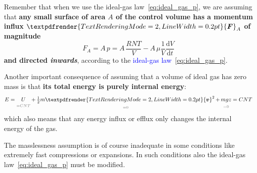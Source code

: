 \documentclass[a4paper,12pt,%
onecolumn,oneside,%
british%
]{memoir}
\renewcommand*{\bm}[1]{\textpdfrender{TextRenderingMode=2,LineWidth=0.2pt}{\boldsymbol{#1}}}
\newcommand*{\di}{\mathrm{d}}%
\renewcommand*{\|}[1][]{\nonscript\:#1\vert\nonscript\:\mathopen{}}
\newcommand*{\sect}{\S}%
\renewcommand*{\autoref}[2]{\sidepar{\vspace{-1ex}\footnotesize{\color{blue}\faIcon{%
angle-right%
}\enskip\sect~\ref{#1} page~\pageref{#1}}}\textcolor{blue}{#2}}
\newcommand*{\yvis}{\mu} %
\newcommand*{\yv}{\bm{v}}
\newcommand*{\yN}{N}
\newcommand*{\ym}{m}%
\newcommand*{\yE}{E}
\newcommand*{\yU}{U}
\newcommand*{\yF}{\bm{F}}
\newcommand*{\ypr}{p} %
\newcommand*{\yT}{T}%
\begin{document}
Remember that when we use the ideal-gas law~\eqref{eq:ideal_gas_p}, we are assuming that \textbf{any small surface of area $A$ of the control volume has a momentum influx $\yF_{A}$ of magnitude}
\begin{equation*}
  F_{A} = A\,\ypr = A\,\frac{R \yN \yT}{V} - A\,\yvis \frac{1}{V}\frac{\di V}{\di t}
\end{equation*}
\textbf{and directed \emph{inwards}}, according to the \autoref{def:idealgas_law}{ideal-gas law}~\eqref{eq:ideal_gas_p}.

\medskip

Another important consequence of assuming that a volume of ideal gas has zero mass is that \textbf{its total energy is purely internal energy}:
\begin{equation*}
  \yE =
 \underbracket[0pt]{\yU}_{\mathcolor{midgrey}{{}=C N \yT}}
  + \underbracket[0pt]{\tfrac12\ym\yv^{2}}_{\mathcolor{midgrey}{{}=0}}
  + \underbracket[0pt]{\ym g z}_{\mathcolor{midgrey}{{}=0}}
  = C N \yT
\end{equation*}
which also means that any energy influx or efflux only changes the internal energy of the gas.

The masslessness assumption is of course inadequate in some conditions like extremely fast compressions or expansions. In such conditions also the ideal-gas law~\eqref{eq:ideal_gas_p} must be modified.

\end{document}
